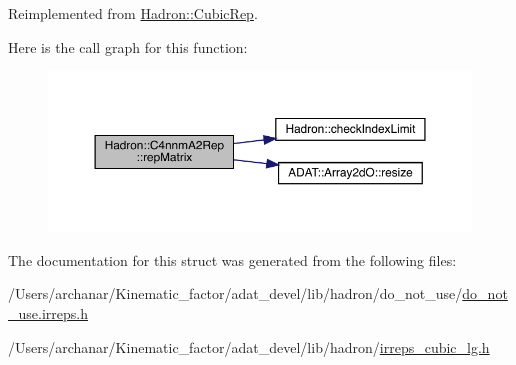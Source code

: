 Reimplemented from \mbox{\hyperlink{structHadron_1_1CubicRep_ac5d7e9e6f4ab1158b5fce3e4ad9e8005}{Hadron\+::\+Cubic\+Rep}}.

Here is the call graph for this function\+:
\nopagebreak
\begin{figure}[H]
\begin{center}
\leavevmode
\includegraphics[width=350pt]{d6/d9a/structHadron_1_1C4nnmA2Rep_a7c58333a62449bb9badf449950b1828b_cgraph}
\end{center}
\end{figure}


The documentation for this struct was generated from the following files\+:\begin{DoxyCompactItemize}
\item 
/\+Users/archanar/\+Kinematic\+\_\+factor/adat\+\_\+devel/lib/hadron/do\+\_\+not\+\_\+use/\mbox{\hyperlink{do__not__use_8irreps_8h}{do\+\_\+not\+\_\+use.\+irreps.\+h}}\item 
/\+Users/archanar/\+Kinematic\+\_\+factor/adat\+\_\+devel/lib/hadron/\mbox{\hyperlink{lib_2hadron_2irreps__cubic__lg_8h}{irreps\+\_\+cubic\+\_\+lg.\+h}}\end{DoxyCompactItemize}
